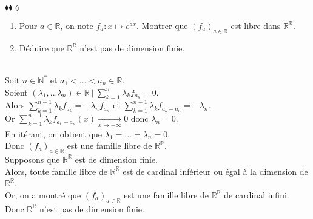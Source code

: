 \documentclass[11pt]{article}
\newcommand*{\R}{\mathbb{R}}
\newcommand*{\N}{\mathbb{N}}
\begin{document}
\begin{exercise}{$\blacklozenge\blacklozenge\lozenge$}{}
    \begin{enumerate}[topsep=0pt,itemsep=-0.9 ex]
        \item Pour $a \in \R$, on note $f_a : x \mapsto e^{ax}$. Montrer que $(f_a)_{a\in\R}$ est libre dans $\R^\R$.
        \item Déduire que $\R^\R$ n'est pas de dimension finie.
    \end{enumerate}
    \tcblower\\[0.2cm]
     Soit $n \in \N^*$ et $a_1 < ... < a_n \in \R$.\\
    Soient $(\lambda_1, ... \lambda_n) \in \R ~ | ~ \sum_{k=1}^n\lambda_k f_{a_k} = 0$.\\
    Alors $\sum_{k=1}^{n-1}\lambda_k f_{a_k} = - \lambda_n f_{a_n}$ et $\sum_{k=1}^{n-1}\lambda_k f_{a_k - a_n} = - \lambda_n$.\\
    Or $\sum_{k=1}^{n-1}\lambda_k f_{a_k - a_n}(x) \xrightarrow[x\to+\infty]{} 0$ donc $\lambda_n = 0$.\\
    En itérant, on obtient que $\lambda_1 = ... = \lambda_n = 0$.\\
    Donc $(f_a)_{a\in\R}$ est une famille libre de $\R^\R$.\\[0.2cm]
     Supposons que $\R^\R$ est de dimension finie.\\
    Alors, toute famille libre de $\R^\R$ est de cardinal inférieur ou égal à la dimension de $\R^\R$.\\
    Or, on a montré que $(f_a)_{a\in\R}$ est une famille libre de $\R^\R$ de cardinal infini.\\
    Donc $\R^\R$ n'est pas de dimension finie.
\end{exercise}
\end{document}
